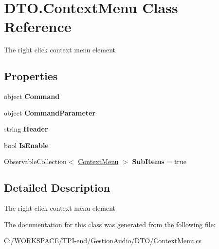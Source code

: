 \hypertarget{class_d_t_o_1_1_context_menu}{}\section{D\+T\+O.\+Context\+Menu Class Reference}
\label{class_d_t_o_1_1_context_menu}


The right click context menu element  


\subsection*{Properties}
\begin{DoxyCompactItemize}
\item 
\mbox{\label{class_d_t_o_1_1_context_menu_a732ac00fad0d9bf181e33ba487fa4330}} 
object {\bfseries Command}
\item 
\mbox{\label{class_d_t_o_1_1_context_menu_a3b2eaf127c61ef4bc2ab35d6bec39e40}} 
object {\bfseries Command\+Parameter}
\item 
\mbox{\label{class_d_t_o_1_1_context_menu_a47bbeb923964b3c3f884bc147ec7e059}} 
string {\bfseries Header}
\item 
\mbox{\label{class_d_t_o_1_1_context_menu_a4932213df0c5653a0c0ca0cd2b8f421a}} 
bool {\bfseries Is\+Enable}
\item 
\mbox{\label{class_d_t_o_1_1_context_menu_ae051ace5a8b74f0a96774c489b2718ba}} 
Observable\+Collection$<$ \hyperlink{class_d_t_o_1_1_context_menu}{Context\+Menu} $>$ {\bfseries Sub\+Items} = true
\end{DoxyCompactItemize}


\subsection{Detailed Description}
The right click context menu element 



The documentation for this class was generated from the following file\+:\begin{DoxyCompactItemize}
\item 
C\+:/\+W\+O\+R\+K\+S\+P\+A\+C\+E/\+T\+P\+I-\/end/\+Gestion\+Audio/\+D\+T\+O/Context\+Menu.\+cs\end{DoxyCompactItemize}
